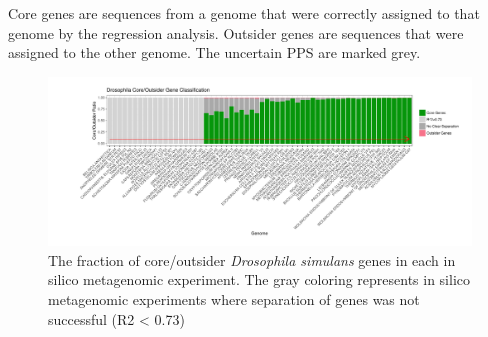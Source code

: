 Core genes are sequences from a genome that were correctly assigned to that
genome by the regression analysis.  Outsider genes are sequences that were
assigned to the other genome. The uncertain PPS are marked grey.
\begin{center}
\begin{figure}
\includegraphics[width=12cm]{figures/core_outsider_barplot_bootstrapped.pdf}
\caption{The fraction of core/outsider \textit{Drosophila simulans} genes in each in
silico metagenomic experiment. The gray coloring represents in silico
metagenomic experiments where separation of genes was not successful (R2 <
0.73)}
\label{fig:rsquared_barplot}
\end{figure}
\end{center}

